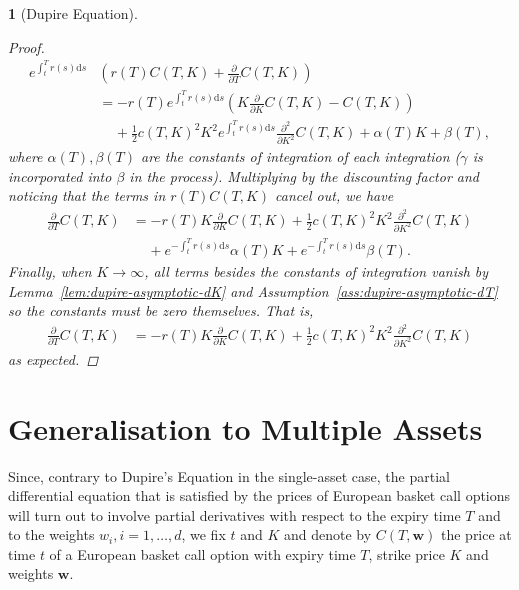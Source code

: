 \documentclass[english]{article}
\numberwithin{equation}{section}
\numberwithin{figure}{section}
\theoremstyle{bolddescit}
\newtheorem{theorem}{\protect\theoremname}[section]
\theoremstyle{definition}
\theoremstyle{definition}
\theoremstyle{plain}
\theoremstyle{plain}
\theoremstyle{bolddesc}
\theoremstyle{plain}
\theoremstyle{remark}
\providecommand{\theoremname}{Theorem}
\begin{document}
\begin{theorem}[Dupire Equation]
\begin{proof}
    \begin{align*}
      e^{\int_t^T r(s) \mathrm{d}s} &\left(r(T) C(T,K) + \frac{\partial}{\partial T}C(T,K)\right)\\
      &= - r(T) e^{\int_t^T r(s) \mathrm{d}s} \left( K \frac{\partial}{\partial K} C(T,K) - C(T,K) \right)\\
        &\ \ \ \ \ + \frac{1}{2} c(T,K)^2 K^2 e^{\int_t^T r(s) \mathrm{d}s}\frac{\partial^2}{\partial K^2} C(T,K) + \alpha(T) K + \beta(T),
    \end{align*}
    where $\alpha(T), \beta(T)$ are the constants of integration of each integration ($\gamma$ is incorporated into $\beta$ in the process). Multiplying by the discounting factor and noticing that the terms in $r(T)C(T,K)$ cancel out, we have
    \begin{align*}
      \frac{\partial}{\partial T}C(T,K)
      &= - r(T) K \frac{\partial}{\partial K} C(T,K)
        + \frac{1}{2} c(T,K)^2 K^2 \frac{\partial^2}{\partial K^2} C(T,K)\\
        &\ \ \ \ \ + e^{-\int_t^T r(s)\mathrm{d}s}\alpha(T) K + e^{-\int_t^T r(s)\mathrm{d}s}\beta(T).
    \end{align*}
    Finally, when $K \to \infty$, all terms besides the constants of integration vanish by Lemma~\ref{lem:dupire-asymptotic-dK} and Assumption~\ref{ass:dupire-asymptotic-dT} so the constants must be zero themselves. That is,
    \begin{align*}
      \frac{\partial}{\partial T}C(T,K)
      &= - r(T) K \frac{\partial}{\partial K} C(T,K)
        + \frac{1}{2} c(T,K)^2 K^2 \frac{\partial^2}{\partial K^2} C(T,K)
    \end{align*}
    as expected.
  \end{proof}
\end{theorem}

\section{Generalisation to Multiple Assets}\label{sec:generalisation}

Since, contrary to Dupire's Equation in the single-asset case, the partial differential equation that is satisfied by the prices of European basket call options will turn out to involve partial derivatives with respect to the expiry time $T$ and to the weights $w_i, i=1,\ldots,d$, we fix $t$ and $K$ and denote by $C(T,\mathbf{w})$ the price at time $t$ of a European basket call option with expiry time $T$, strike price $K$ and weights $\mathbf{w}$.
\end{document}
